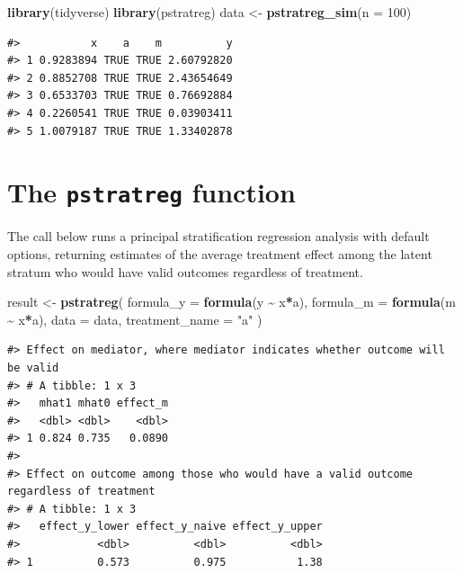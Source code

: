 \documentclass[
]{book}
\newenvironment{Shaded}{\begin{snugshade}}{\end{snugshade}}
\newcommand{\AttributeTok}[1]{\textcolor[rgb]{0.13,0.29,0.53}{#1}}
\newcommand{\DecValTok}[1]{\textcolor[rgb]{0.00,0.00,0.81}{#1}}
\newcommand{\FunctionTok}[1]{\textcolor[rgb]{0.13,0.29,0.53}{\textbf{#1}}}
\newcommand{\NormalTok}[1]{#1}
\newcommand{\OtherTok}[1]{\textcolor[rgb]{0.56,0.35,0.01}{#1}}
\newcommand{\SpecialCharTok}[1]{\textcolor[rgb]{0.81,0.36,0.00}{\textbf{#1}}}
\newcommand{\StringTok}[1]{\textcolor[rgb]{0.31,0.60,0.02}{#1}}
\begin{document}
\begin{Shaded}
\begin{Highlighting}[]
\FunctionTok{library}\NormalTok{(tidyverse)}
\FunctionTok{library}\NormalTok{(pstratreg)}
\NormalTok{data }\OtherTok{\textless{}{-}} \FunctionTok{pstratreg\_sim}\NormalTok{(}\AttributeTok{n =} \DecValTok{100}\NormalTok{)}
\end{Highlighting}
\end{Shaded}

\begin{verbatim}
#>           x    a    m          y
#> 1 0.9283894 TRUE TRUE 2.60792820
#> 2 0.8852708 TRUE TRUE 2.43654649
#> 3 0.6533703 TRUE TRUE 0.76692884
#> 4 0.2260541 TRUE TRUE 0.03903411
#> 5 1.0079187 TRUE TRUE 1.33402878
\end{verbatim}

\hypertarget{the-pstratreg-function}{%
\section{\texorpdfstring{The \texttt{pstratreg} function}{The pstratreg function}}\label{the-pstratreg-function}}

The call below runs a principal stratification regression analysis with default options, returning estimates of the average treatment effect among the latent stratum who would have valid outcomes regardless of treatment.

\begin{Shaded}
\begin{Highlighting}[]
\NormalTok{result }\OtherTok{\textless{}{-}} \FunctionTok{pstratreg}\NormalTok{(}
  \AttributeTok{formula\_y =} \FunctionTok{formula}\NormalTok{(y }\SpecialCharTok{\textasciitilde{}}\NormalTok{ x}\SpecialCharTok{*}\NormalTok{a),}
  \AttributeTok{formula\_m =} \FunctionTok{formula}\NormalTok{(m }\SpecialCharTok{\textasciitilde{}}\NormalTok{ x}\SpecialCharTok{*}\NormalTok{a),}
  \AttributeTok{data =}\NormalTok{ data,}
  \AttributeTok{treatment\_name =} \StringTok{"a"}
\NormalTok{)}
\end{Highlighting}
\end{Shaded}

\begin{verbatim}
#> Effect on mediator, where mediator indicates whether outcome will be valid
#> # A tibble: 1 x 3
#>   mhat1 mhat0 effect_m
#>   <dbl> <dbl>    <dbl>
#> 1 0.824 0.735   0.0890
#> 
#> Effect on outcome among those who would have a valid outcome regardless of treatment
#> # A tibble: 1 x 3
#>   effect_y_lower effect_y_naive effect_y_upper
#>            <dbl>          <dbl>          <dbl>
#> 1          0.573          0.975           1.38
\end{verbatim}
\end{document}
